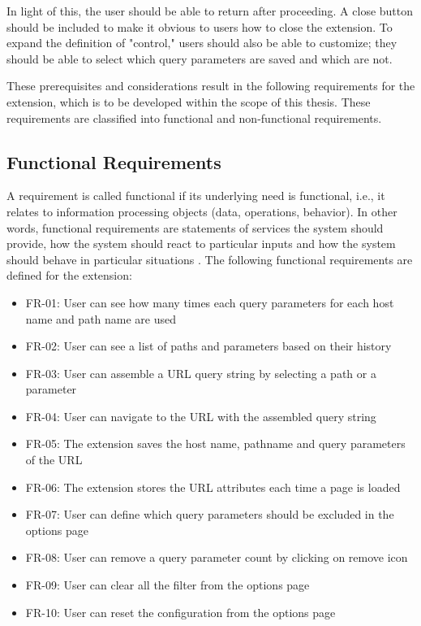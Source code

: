 In light of this, the user should be able to return after proceeding. A close button should be included to make it obvious to users how to close the extension. To expand the definition of "control," users should also be able to customize; they should be able to select which query parameters are saved and which are not.

These prerequisites and considerations result in the following requirements for the extension, which is to be developed within the scope of this thesis. These requirements are classified into functional and non-functional requirements.

\subsection{Functional Requirements}
A requirement is called functional if its underlying need is functional, i.e., it relates to information processing objects (data, operations, behavior). In other words, functional requirements are statements of services the system should provide, how the system should react to particular inputs and how the system should behave in particular situations \autocite{sommerville2011software}. The following functional requirements are defined for the extension:

\begin{itemize}
  \item FR-01: User can see how many times each query parameters for each host name and path name are used
  \item FR-02: User can see a list of paths and parameters based on their history
  \item FR-03: User can assemble a URL query string by selecting a path or a parameter
  \item FR-04: User can navigate to the URL with the assembled query string
  \item FR-05: The extension saves the host name, pathname and query parameters of the URL
  \item FR-06: The extension stores the URL attributes each time a page is loaded
  \item FR-07: User can define which query parameters should be excluded in the options page
  \item FR-08: User can remove a query parameter count by clicking on remove icon
  \item FR-09: User can clear all the filter from the options page
  \item FR-10: User can reset the configuration from the options page
\end{itemize}

